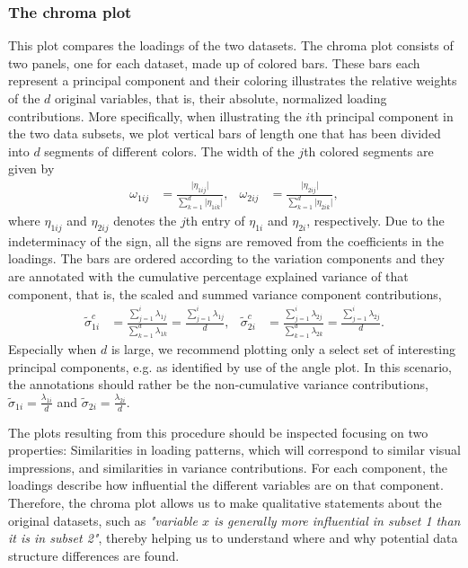 \documentclass[titlepage,11pt,twoside]{article}
\begin{document}
\subsubsection{The chroma plot}
This plot compares the loadings of the two datasets. The chroma plot consists of two panels, one for each dataset, made up of colored bars. These bars each represent a principal component and their coloring illustrates the relative weights of the $d$ original variables, that is, their absolute, normalized loading contributions. More specifically, when illustrating the $i$th principal component in the two data subsets, we plot vertical bars of length one that has been divided into $d$ segments of different colors. The width of the $j$th colored segments are given by
\begin{align*}
\omega_{1ij} &= \frac{\lvert\eta_{1ij}\rvert}{\sum_{k=1}^d \lvert\eta_{1ik}\rvert}, &
\omega_{2ij} &= \frac{\lvert\eta_{2ij}\rvert}{\sum_{k=1}^d \lvert\eta_{2ik}\rvert},
\end{align*}
where $\eta_{1ij}$ and $\eta_{2ij}$ denotes the $j$th entry of $\eta_{1i}$ and $\eta_{2i}$, respectively. Due to the indeterminacy of the sign, all the signs are removed from the coefficients in the loadings. The bars are ordered according to the variation components and they are annotated with the cumulative percentage explained variance of that component, that is, the scaled and summed variance component contributions,
\begin{align*}
\tilde\sigma^c_{1i} &= \frac{\sum_{j=1}^i \lambda_{1j}}{\sum_{k=1}^d \lambda_{1k}} = \frac{\sum_{j=1}^i \lambda_{1j}}{d}, &
\tilde\sigma^c_{2i} &= \frac{\sum_{j=1}^i \lambda_{2j}}{\sum_{k=1}^d \lambda_{2k}} = \frac{\sum_{j=1}^i \lambda_{2j}}{d}.
\end{align*}
Especially when $d$ is large, we recommend plotting only a select set of interesting principal components, e.g. as identified by use of the angle plot. In this scenario, the annotations should rather be the non-cumulative variance contributions, $\tilde\sigma_{1i} = \frac{\lambda_{1i}}{d}$ and $\tilde\sigma_{2i} = \frac{\lambda_{2i}}{d}$.

The plots resulting from this procedure should be inspected focusing on two properties: Similarities in loading patterns, which will correspond to similar visual impressions, and similarities in variance contributions. For each component, the loadings describe how influential the different variables are on that component. Therefore, the chroma plot allows us to make qualitative statements about the original datasets, such as \textit{"variable $x$ is generally more influential in subset 1 than it is in subset 2"}, thereby helping us to understand where and why potential data structure differences are found.
\end{document}
